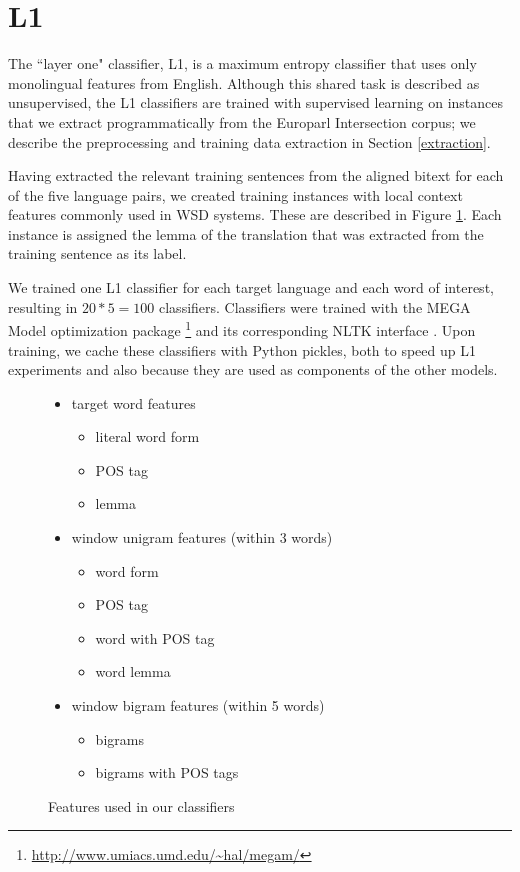 \documentclass[11pt,letterpaper]{article}
\begin{document}
\section{L1}
The ``layer one" classifier, L1, is a maximum entropy classifier that
uses only monolingual features from English. Although this shared task is
described as unsupervised, the L1 classifiers are trained with supervised
learning on instances that we extract programmatically from the Europarl
Intersection corpus; we describe the preprocessing and training data extraction
in Section \ref{extraction}.

Having extracted the relevant training sentences from the aligned bitext for
each of the five language pairs, we created training instances with local
context features commonly used in WSD systems. These are described in Figure
\ref{fig:features}. Each instance is assigned the lemma of the translation that
was extracted from the training sentence as its label.

We trained one L1 classifier for each target language and each word of
interest, resulting in $20*5 = 100$ classifiers. Classifiers were trained with
the MEGA Model optimization package \cite{daume04cg-bfgs}
\footnote{\url{http://www.umiacs.umd.edu/~hal/megam/}} and its corresponding
NLTK interface \cite{nltkbook}. Upon training, we cache these classifiers with
Python pickles, both to speed up L1 experiments and also because they are used
as components of the other models.

\begin{figure}
  \begin{itemize}  %
  
  \item target word features
  \begin{itemize}  %
       \item literal word form
       \item POS tag
       \item lemma
  \end{itemize}
  \item window unigram features (within 3 words)
  \begin{itemize} %
  		\item word form
  		\item POS tag
  		\item word with POS tag
  		\item word lemma
  \end{itemize}
  \item window bigram features (within 5 words)
  \begin{itemize} %
  		\item bigrams 
  		\item bigrams with POS tags
  \end{itemize}  
  \end{itemize}   %
  \caption{Features used in our classifiers}
  \label{fig:features}
\end{figure}
\end{document}
